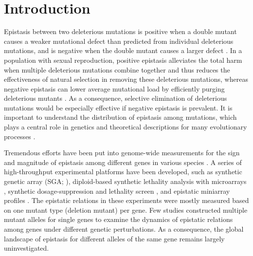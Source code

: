 \section{Introduction}

Epistasis between two deleterious mutations is positive when a double
mutant causes a weaker mutational defect than predicted from
individual deleterious mutations, and is negative when the double
mutant causes a larger defect \citep{Phillips2008, Boone2007}. In a
population with sexual
reproduction, positive epistasis alleviates the total harm when
multiple deleterious mutations combine together and thus reduces the
effectiveness of natural selection in removing these deleterious
mutations, whereas negative epistasis can lower average mutational
load by efficiently purging deleterious mutants \citep{Kimura1966}. As
a consequence,
selective elimination of deleterious mutations would be especially
effective if negative epistasis is prevalent. It is important to
understand the distribution of epistasis among mutations, which plays
a central role in genetics and theoretical descriptions for many
evolutionary processes \citep{Phillips2008, Boone2007}.

Tremendous efforts have been put into genome-wide measurements for the
sign and magnitude of epistasis among different genes in various
species \citep{Costanzo2010, Tong2004, Pan2004, Pan2006,
ISI:000176466300018, Measday2005, Sopko2006, Collins2007,
Kornmann2009, Fiedler2009, Bonhoeffer2004, Roguev2008}.  A series of
high-throughput experimental platforms have been developed, such as
synthetic genetic array (SGA; \citealt{Costanzo2010, Tong2004}),
diploid-based synthetic lethality analysis with microarrays
\citep{Pan2004, Pan2006}, synthetic dosage-suppression and lethality
screen \citep{ISI:000176466300018, Measday2005, Sopko2006}, and
epistatic miniarray profiles \citep{Collins2007, Kornmann2009,
Fiedler2009}. The epistatic relations in these
experiments were mostly measured based on one mutant type (deletion
mutant) per gene. Few studies constructed multiple mutant alleles for
single genes to examine the dynamics of epistatic relations among
genes under different genetic perturbations. As a consequence, the
global landscape of epistasis for different alleles of the same gene
remains largely uninvestigated.

